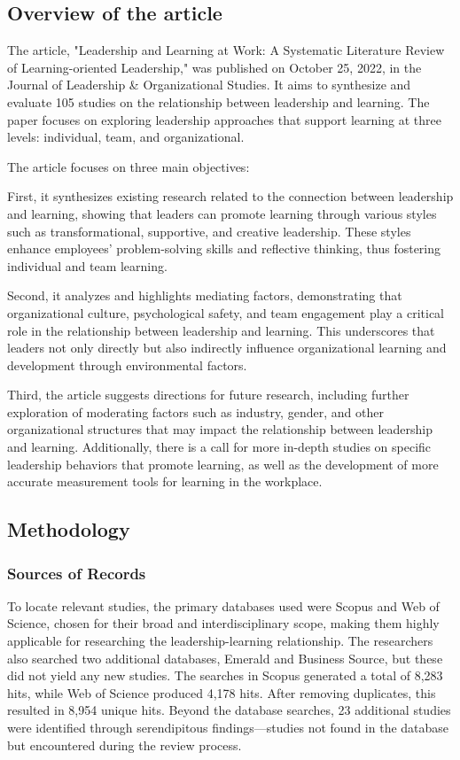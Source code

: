 \subsection{Overview of the article}
The article, "Leadership and Learning at Work: A Systematic Literature Review of Learning-oriented
Leadership," was published on October 25, 2022, in the Journal of Leadership \& Organizational
Studies. It aims to synthesize and evaluate 105 studies on the relationship between leadership and
learning. The paper focuses on exploring leadership approaches that support learning at three
levels: individual, team, and organizational.

The article focuses on three main objectives:

First, it synthesizes existing research related to the connection between leadership and learning,
showing that leaders can promote learning through various styles such as transformational,
supportive, and creative leadership. These styles enhance employees' problem-solving skills and
reflective thinking, thus fostering individual and team learning.

Second, it analyzes and highlights mediating factors, demonstrating that organizational culture,
psychological safety, and team engagement play a critical role in the relationship between
leadership and learning. This underscores that leaders not only directly but also indirectly
influence organizational learning and development through environmental factors.

Third, the article suggests directions for future research, including further exploration of
moderating factors such as industry, gender, and other organizational structures that may impact the
relationship between leadership and learning. Additionally, there is a call for more in-depth
studies on specific leadership behaviors that promote learning, as well as the development of more
accurate measurement tools for learning in the workplace.

\subsection{Methodology}

\subsubsection{Sources of Records}
To locate relevant studies, the primary databases used were Scopus and Web of Science, chosen for
their broad and interdisciplinary scope, making them highly applicable for researching the
leadership-learning relationship. The researchers also searched two additional databases, Emerald
and Business Source, but these did not yield any new studies. The searches in Scopus generated a
total of 8,283 hits, while Web of Science produced 4,178 hits. After removing duplicates, this
resulted in 8,954 unique hits. Beyond the database searches, 23 additional studies were identified
through serendipitous findings—studies not found in the database but encountered during the review
process.

